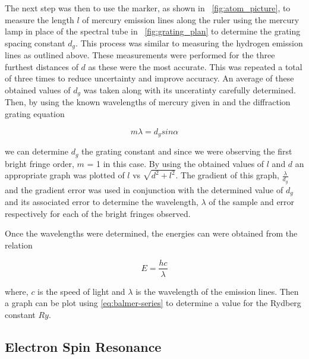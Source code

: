 \documentclass{article}
\newcommand{\figref}[2][\figurename~]{#1\ref{#2}}
\begin{document}
\vspace{2mm}
\noindent
The next step was then to use the marker, as shown in \figref{fig:atom_picture}, to measure the length $l$ of mercury emission lines along the ruler using the mercury lamp in place of the spectral tube in \figref{fig:grating_plan} to determine the grating spacing constant $d_g$. This process was similar to measuring the hydrogen emission lines as outlined above. These measurements were performed for the three furthest distances of $d$ as these were the most accurate. This was repeated a total of three times to reduce uncertainty and improve accuracy. An average of these obtained values of $d_g$ was taken along with its unceratinty carefully determined. Then, by using the known wavelengths of mercury given in \cite{Paper01} and the diffraction grating equation 

\begin{equation}
\label{eq:grating-equation}
m\lambda = d_gsin\alpha
\end{equation}

\vspace{2mm}
\noindent
we can determine $d_g$ the grating constant and since we were observing the first bright fringe order, $m$ = 1 in this case. By using the obtained values of $l$ and $d$ an appropriate graph was plotted of $l$ vs $\sqrt{d^2 + l^2}$. The gradient of this graph, $\frac{\lambda}{d_g}$ and the gradient error was used in conjunction with the determined value of $d_g$ and its associated error to determine the wavelength, $\lambda$ of the sample and error respectively for each of the bright fringes observed.

\vspace{2mm}
\noindent
Once the wavelengths were determined, the energies can were obtained from the relation 

\begin{equation}
\label{eq:energy-wavelength}
E = \frac{hc}{\lambda}
\end{equation}

\vspace{2mm}
\noindent
where, $c$ is the speed of light and $\lambda$ is the wavelength of the emission lines. Then a graph can be plot using \eqref{eq:balmer-series} to determine a value for the Rydberg constant $Ry$.

\subsection{Electron Spin Resonance}
\label{ssec:electron-method}
\end{document}
